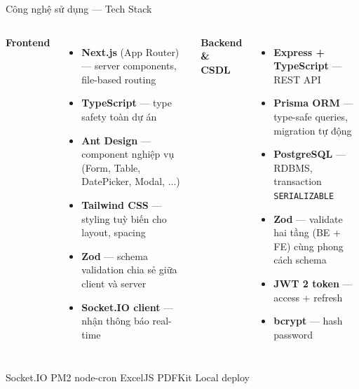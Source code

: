 \documentclass[aspectratio=43,xcolor=table]{beamer}
\newcommand{\hustpill}[1]{\colorbox{hustlight}{\textcolor{hustred}{\small #1}}}
\begin{document}
\begin{frame}{Công nghệ sử dụng --- Tech Stack}
  \begin{columns}[T,onlytextwidth]
    \textcolor{hustred}{\textbf{Frontend}}
    \begin{itemize}\small
      \item \textbf{Next.js} (App Router) --- server components, file-based routing
      \item \textbf{TypeScript} --- type safety toàn dự án
      \item \textbf{Ant Design} --- component nghiệp vụ (Form, Table, DatePicker, Modal, ...)
      \item \textbf{Tailwind CSS} --- styling tuỳ biến cho layout, spacing
      \item \textbf{Zod} --- schema validation chia sẻ giữa client và server
      \item \textbf{Socket.IO client} --- nhận thông báo real-time
    \end{itemize}

    \textcolor{hustred}{\textbf{Backend \& CSDL}}
    \begin{itemize}\small
      \item \textbf{Express + TypeScript} --- REST API
      \item \textbf{Prisma ORM} --- type-safe queries, migration tự động
      \item \textbf{PostgreSQL} --- RDBMS, transaction \texttt{SERIALIZABLE}
      \item \textbf{Zod} --- validate hai tầng (BE + FE) cùng phong cách schema
      \item \textbf{JWT 2 token} --- access + refresh
      \item \textbf{bcrypt} --- hash password
    \end{itemize}
  \end{columns}

  \vspace{0.3cm}
  \centering
  \hustpill{Socket.IO} \hustpill{PM2} \hustpill{node-cron} \hustpill{ExcelJS} \hustpill{PDFKit} \hustpill{Local deploy}
\end{frame}
\end{document}
